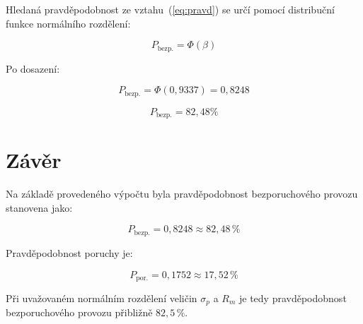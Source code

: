 Hledaná pravděpodobnost ze vztahu~(\ref{eq:pravd}) se určí pomocí distribuční funkce normálního rozdělení:

\begin{equation}
P_{\text{bezp.}} = \Phi(\beta)
\label{eq:Phi}
\end{equation}

Po dosazení:

\[
P_{\text{bezp.}} = \Phi(0{,}9337) = 0{,}8248
\]

\[
P_{\text{bezp.}} = 82{,}48 \%
\]

\section*{Závěr}

Na základě provedeného výpočtu byla pravděpodobnost bezporuchového provozu stanovena jako:

\[
\boxed{P_{\text{bezp.}} = 0{,}8248 \approx 82{,}48\,\%}
\]

\noindent
Pravděpodobnost poruchy je:

\[
\boxed{P_{\text{por.}} = 0{,}1752 \approx 17{,}52\,\%}
\]

\noindent
Při uvažovaném normálním rozdělení veličin $\sigma_p$ a $R_m$ je tedy pravděpodobnost bezporuchového provozu přibližně $82{,}5\,\%$.

\restoregeometry

